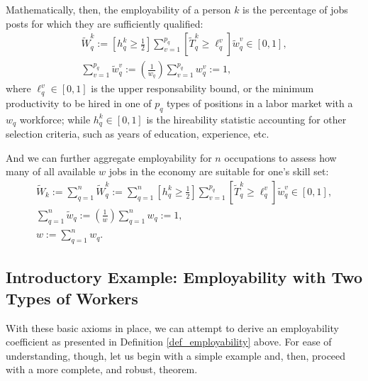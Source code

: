 \documentclass[hidelinks, nonatbib]{elsarticle}
\begin{document}
\begin{definition}[Employability]
    \label{def_employability}
    Mathematically, then, the employability of a person $k$ is the percentage of jobs posts for which they are sufficiently qualified:
    \begin{gather}
    \tilde{W}_{q}^{k}
    :=
    \left[
        h_{q}^{k}
        \geq
        \frac{1}{2}
    \right]
    \sum_{v=1}^{p_q}
    \left[
        \tilde{T}_{q}^{k}
        \geq
        \ell_{q}^{v}
    \right]
    \tilde{w}_{q}^{v}
    \in
    [0,1]
    ,
    \\
    \sum_{v=1}^{p_q}
    \tilde{w}_{q}^{v}
    :=
    \left(
        \frac{1}{w_q}
    \right)
    \sum_{v=1}^{p_q}
    w_{q}^{v}
    := 1
    ,
    \end{gather}
    where $\ell_{q}^{v} \in [0,1]$ is the upper responsability bound, or the minimum productivity to be hired in one of $p_q$ types of positions in a labor market with a $w_q$ workforce; while $h_{q}^{k} \in [0,1]$ is the hireability statistic accounting for other selection criteria, such as years of education, experience, etc.
    
    And we can further aggregate employability for $n$ occupations to assess how many of all available $w$ jobs in the economy are suitable for one's skill set:
    \begin{gather}
    \tilde{W}_{k}
    :=
    \sum_{q=1}^{n}
    \tilde{W}_{q}^{k}
    :=
    \sum_{q=1}^{n}
    \left[
        h_{q}^{k}
        \geq
        \frac{1}{2}
    \right]
    \sum_{v=1}^{p_q}
    \left[
        \tilde{T}_{q}^{k}
        \geq
        \ell_{q}^{v}
    \right]
    \tilde{w}_{q}^{v}
    \in
    [0,1]
    ,
    \\
    \sum_{q=1}^{n}
    \tilde{w}_{q}
    :=
    \left(
        \frac{1}{w}
    \right)
    \sum_{q=1}^{n}
    {w}_{q}
    :=
    1
    ,
    \\
    w
    :=
    \sum_{q=1}^{n}
    {w}_{q}
    .
    \end{gather}
\end{definition}

\subsection{Introductory Example: Employability with Two Types of Workers}
With these basic axioms in place, we can attempt to derive an employability coefficient as presented in Definition \ref{def_employability} above. For ease of understanding, though, let us begin with a simple example and, then, proceed with a more complete, and robust, theorem.
\end{document}

